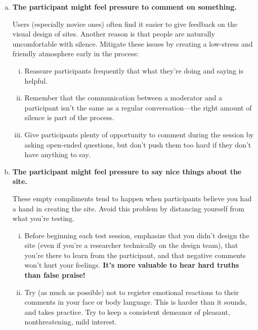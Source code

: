 \begin{enumerate}[a)]
	\item \textbf{The participant might feel pressure to comment on something.} \par Users (especially novice ones) often find it easier to give feedback on the visual design of sites. Another reason is that people are naturally uncomfortable with silence. Mitigate these issues by creating a low-stress and friendly atmosphere early in the process:
	\begin{enumerate}[(i)]
		\item Reassure participants frequently that what they’re doing and saying is helpful.
		\item Remember that the communication between a moderator and a participant isn’t the same as a regular conversation---the right amount of silence is part of the process.
		\item Give participants plenty of opportunity to comment during the session by asking open-ended questions, but don’t push them too hard if they don’t have anything to say.
	\end{enumerate} 
	
	\item \textbf{The participant might feel pressure to say nice things about the site.} \par These empty compliments tend to happen when participants believe you had a hand in creating the site.
	Avoid this problem by distancing yourself from what you’re testing.
	\begin{enumerate}[(i)]
		\item Before beginning each test session, emphasize that you didn’t design the site (even if you’re a researcher technically on the design team), that you’re there to learn from the participant, and that negative comments won’t hurt your feelings. \textbf{It’s more valuable to hear hard truths than false praise!}
		\item Try (as much as possible) not to register emotional reactions to their comments in your face or body language. This is harder than it sounds, and takes practice. Try to keep a consistent demeanor of pleasant, nonthreatening, mild interest.
	\end{enumerate}
		

\end{enumerate}
